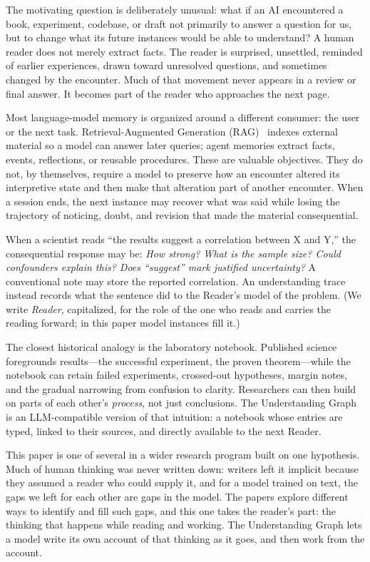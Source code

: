 The motivating question is deliberately unusual: what if an AI encountered a book, experiment, codebase, or draft not primarily to answer a question for us, but to change what its future instances would be able to understand? A human reader does not merely extract facts. The reader is surprised, unsettled, reminded of earlier experiences, drawn toward unresolved questions, and sometimes changed by the encounter. Much of that movement never appears in a review or final answer. It becomes part of the reader who approaches the next page.

Most language-model memory is organized around a different consumer: the user or the next task. Retrieval-Augmented Generation (RAG)~\cite{lewis2020rag} indexes external material so a model can answer later queries; agent memories extract facts, events, reflections, or reusable procedures. These are valuable objectives. They do not, by themselves, require a model to preserve how an encounter altered its interpretive state and then make that alteration part of another encounter. When a session ends, the next instance may recover what was said while losing the trajectory of noticing, doubt, and revision that made the material consequential.

When a scientist reads ``the results suggest a correlation between X and Y,'' the consequential response may be: \emph{How strong? What is the sample size? Could confounders explain this? Does ``suggest'' mark justified uncertainty?} A conventional note may store the reported correlation. An understanding trace instead records what the sentence did to the Reader's model of the problem. (We write \emph{Reader}, capitalized, for the role of the one who reads and carries the reading forward; in this paper model instances fill it.)

The closest historical analogy is the laboratory notebook. Published science foregrounds results---the successful experiment, the proven theorem---while the notebook can retain failed experiments, crossed-out hypotheses, margin notes, and the gradual narrowing from confusion to clarity. Researchers can then build on parts of each other's \emph{process}, not just conclusions. The Understanding Graph is an LLM-compatible version of that intuition: a notebook whose entries are typed, linked to their sources, and directly available to the next Reader.

This paper is one of several in a wider research program built on one hypothesis. Much of human thinking was never written down: writers left it implicit because they assumed a reader who could supply it, and for a model trained on text, the gaps we left for each other are gaps in the model. The papers explore different ways to identify and fill such gaps, and this one takes the reader's part: the thinking that happens while reading and working. The Understanding Graph lets a model write its own account of that thinking as it goes, and then work from the account.

